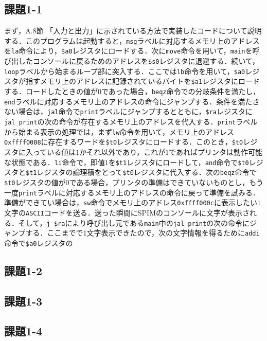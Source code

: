 \subsection{課題1-1}
まず，A.8節 「入力と出力」に示されている方法で実装したコードについて説明する．このプログラムは起動すると，\verb|msg|ラベルに対応するメモリ上のアドレスを\verb|la|命令により，\verb|$a0|レジスタにロードする．次に\verb|move|命令を用いて，\verb|main|を呼び出したコンソールに戻るためのアドレスを\verb|$s0|レジスタに退避する．続いて，\verb|loop|ラベルから始まるループ部に突入する．ここでは\verb|lb|命令を用いて，\verb|$a0|レジスタが指すメモリ上のアドレスに記録されているバイトを\verb|$a1|レジスタにロードする．ロードしたときの値が$0$であった場合，\verb|beqz|命令での分岐条件を満たし，\verb|end|ラベルに対応するメモリ上のアドレスの命令にジャンプする．条件を満たさない場合は，\verb|jal|命令で\verb|print|ラベルにジャンプするとともに，\verb|$ra|レジスタに\verb|jal print|の次の命令が存在するメモリ上のアドレスを代入する．\verb|print|ラベルから始まる表示の処理では，まず\verb|lw|命令を用いて，メモリ上のアドレス\verb|0xffff0008|に存在するワードを\verb|$t0|レジスタにロードする．このとき，\verb|$t0|レジスタに入っている値は$1$かそれ以外であり，これが$1$であればプリンタは動作可能な状態である．\verb|li|命令で，即値$1$を\verb|$t1|レジスタにロードして，\verb|and|命令で\verb|$t0|レジスタと\verb|$t1|レジスタの論理積をとって\verb|$t0|レジスタに代入する．次の\verb|beqz|命令で\verb|$t0|レジスタの値が$0$である場合，プリンタの準備はできていないものとし，もう一度\verb|print|ラベルに対応するメモリ上のアドレスの命令に戻って準備を試みる．準備ができてい場合は，\verb|sw|命令でメモリ上のアドレス\verb|0xffff000c|に表示したい$1$文字の\verb|ASCII|コードを送る．送った瞬間にSPIMのコンソールに文字が表示される．そして，\verb|j $ra|により呼び出し元である\verb|main|中の\verb|jal print|の次の命令にジャンプする．ここまでで1文字表示できたので，次の文字情報を得るために\verb|addi|命令で\verb|$a0|レジスタの




\subsection{課題1-2}


\subsection{課題1-3}


\subsection{課題1-4}



